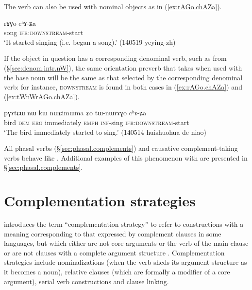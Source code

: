 The verb  can also be used with nominal objects as in (\ref{ex:rAGo.chAZa}). 

\begin{exe}
\ex \label{ex:rAGo.chAZa}
\gll rɤɣo cʰɤ-ʑa \\
song \textsc{ifr}:\textsc{downstream}-start \\
\glt `It started singing (i.e. began a song).' (140519 yeying-zh)
\end{exe}

If the object in question has a corresponding denominal verb, such as  from  (§\ref{sec:denom.intr.nW}), the same orientation preverb that  takes when used with the base noun will be the same as that selected by the corresponding denominal verb: for instance, \textsc{downstream} is found in both cases in (\ref{ex:rAGo.chAZa}) and (\ref{ex:tWnWrAGo.chAZa}).


\begin{exe}
\ex \label{ex:tWnWrAGo.chAZa}
\gll pɣɤtɕɯ nɯ kɯ nɯɕimɯma ʑo tɯ-nɯrɤɣo cʰɤ-ʑa  \\
bird \textsc{dem} \textsc{erg} immediately \textsc{emph} \textsc{inf}-sing \textsc{ifr}:\textsc{downstream}-start \\
\glt `The bird immediately started to sing.' (140514 huishuohua de niao)
\end{exe}

All phasal verbs (§\ref{sec:phasal.complements}) and causative com\-ple\-ment-taking verbs behave like . Additional examples of this phenomenon with  are presented in §\ref{sec:phasal.complements}.


\section{Complementation strategies}  \label{sec:strategies}
\citet{dixon06complementation} introduces the term ``complementation strategy'' to refer to constructions with a meaning corresponding to that expressed by complement clauses in some languages, but which either are not core arguments or the verb of the main clause or are not clauses with a complete argument structure \citep[34--40]{dixon06complementation}. Complementation strategies include nominalizations (when the verb sheds its argument structure as it becomes a noun), relative clauses (which are formally a modifier of a core argument), serial verb constructions and clause linking.

